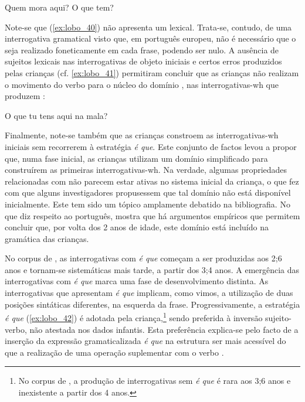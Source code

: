 \documentclass[output=paper]{LSP/langsci}
\begin{document}
\ea\label{ex:lobo_39} Quem mora aqui?\z
\ea\label{ex:lobo_40} O que tem?\z

Note-se que (\ref{ex:lobo_40}) não apresenta um  lexical. Trata-se, contudo, de uma interrogativa gramatical visto que, em português europeu, não é necessário que o  seja realizado foneticamente em cada frase, podendo ser nulo. A ausência de sujeitos lexicais nas interrogativas de objeto iniciais e certos erros produzidos pelas crianças (cf. \ref{ex:lobo_41}) permitiram concluir que as crianças não realizam o movimento do verbo para o núcleo do domínio , nas interrogativas-wh que produzem \citep{soares2003,soares2004,soares2006}:

\ea\label{ex:lobo_41} O que tu tens aqui na mala?\z

Finalmente, note-se também que as crianças constroem as interrogativas-wh iniciais sem recorrerem à estratégia \textit{é que}. Este conjunto de factos levou \citet{soares2006} a propor que, numa fase inicial, as crianças utilizam um domínio  simplificado para construírem as primeiras interrogativas-wh. Na verdade, algumas propriedades relacionadas com  não parecem estar ativas no sistema inicial da criança, o que fez com que alguns investigadores propusessem que tal domínio não está disponível inicialmente. Este tem sido um tópico amplamente debatido na bibliografia. No que diz respeito ao português, \citet{soares2006} mostra que há argumentos empíricos que permitem concluir que, por volta dos 2 anos de idade, este domínio está incluído na gramática das crianças.

No corpus de \citet{soares2006}, as interrogativas com \textit{é que} começam a ser produzidas aos 2;6 anos e tornam-se sistemáticas mais tarde, a partir dos 3;4 anos. A emergência das interrogativas com \textit{é que} marca uma fase de desenvolvimento distinta. As interrogativas que apresentam \textit{é que} implicam, como vimos, a utilização de duas posições sintáticas diferentes, na  esquerda da frase. Progressivamente, a estratégia \textit{é que} (\ref{ex:lobo_42}) é adotada pela criança,\footnote{No corpus de \citet{soares2006}, a produção de interrogativas sem \textit{é que} é rara aos 3;6 anos e inexistente a partir dos 4 anos.} sendo preferida à inversão sujeito-verbo, não atestada nos dados infantis. Esta preferência explica-se pelo facto de a inserção da expressão gramaticalizada \textit{é que} na estrutura ser mais acessível do que a realização de uma operação suplementar com o verbo \citep{soares2003,soares2004,soares2006}.
\end{document}
